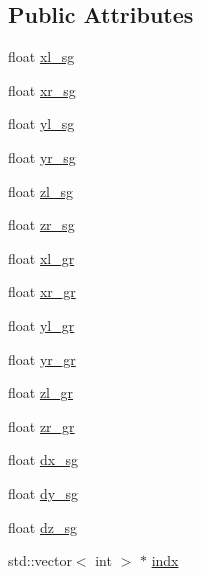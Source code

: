 \subsection*{Public Attributes}
\begin{DoxyCompactItemize}
\item 
float \hyperlink{structccmc_1_1_smart_grid_search_values_a5bbd1f9dc336ea5e3a647099c418c70b}{xl\-\_\-sg}
\item 
float \hyperlink{structccmc_1_1_smart_grid_search_values_a2f1bbf532c6f16ce34669aff727bd459}{xr\-\_\-sg}
\item 
float \hyperlink{structccmc_1_1_smart_grid_search_values_a0b781048782983f284a8d462ce9aad6a}{yl\-\_\-sg}
\item 
float \hyperlink{structccmc_1_1_smart_grid_search_values_a8f45167a97edaf9a3e27c66926f83349}{yr\-\_\-sg}
\item 
float \hyperlink{structccmc_1_1_smart_grid_search_values_a5fb89265acfd6f65e95d71ae9ddc8a96}{zl\-\_\-sg}
\item 
float \hyperlink{structccmc_1_1_smart_grid_search_values_aafc8fc1c1fbadae14f2a921f14853189}{zr\-\_\-sg}
\item 
float \hyperlink{structccmc_1_1_smart_grid_search_values_a97dedefd65bbb420b1ec807f56864cff}{xl\-\_\-gr}
\item 
float \hyperlink{structccmc_1_1_smart_grid_search_values_a4f119af107f42583cf352d3381e5d8e2}{xr\-\_\-gr}
\item 
float \hyperlink{structccmc_1_1_smart_grid_search_values_a457f474f90f829ae59a91f7db3987f6c}{yl\-\_\-gr}
\item 
float \hyperlink{structccmc_1_1_smart_grid_search_values_a0dc3ec1a181e4100790ff07790e0afa2}{yr\-\_\-gr}
\item 
float \hyperlink{structccmc_1_1_smart_grid_search_values_a48282880363f71c4808e1c52b02b3f15}{zl\-\_\-gr}
\item 
float \hyperlink{structccmc_1_1_smart_grid_search_values_a8b574711e03c10b054ce85b65123349b}{zr\-\_\-gr}
\item 
float \hyperlink{structccmc_1_1_smart_grid_search_values_a8720013dfad578743e4de0db55e329ed}{dx\-\_\-sg}
\item 
float \hyperlink{structccmc_1_1_smart_grid_search_values_a89883d9831bc0424f2e155217f4746e5}{dy\-\_\-sg}
\item 
float \hyperlink{structccmc_1_1_smart_grid_search_values_a2e9f13ff4816d05b96220d07d0878b05}{dz\-\_\-sg}
\item 
std\-::vector$<$ int $>$ $\ast$ \hyperlink{structccmc_1_1_smart_grid_search_values_adfafcb5107e619a0f4f6ac4663bfa4ba}{indx}

\end{DoxyCompactItemize}
